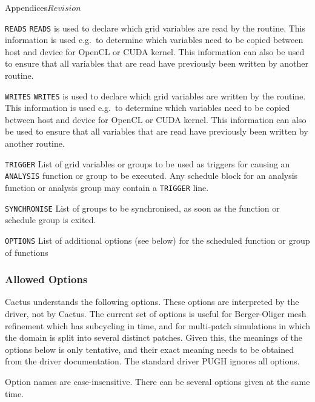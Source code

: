 \begin{cactuspart}{Appendices}{}{$Revision$}
\begin{Lentry}
\item[\texttt{READS}] \texttt{READS} is used to declare which grid
  variables are read by the routine. This information is used e.g.\ to
  determine which variables need to be copied between host and device
  for OpenCL or CUDA kernel. This information can also be used to
  ensure that all variables that are read have previously been written
  by another routine.

\item[\texttt{WRITES}] \texttt{WRITES} is used to declare which grid
  variables are written by the routine. This information is used e.g.\ to
  determine which variables need to be copied between host and device
  for OpenCL or CUDA kernel. This information can also be used to
  ensure that all variables that are read have previously been written
  by another routine.

  \item[{\tt TRIGGER}] List of grid variables or groups to be used as
  triggers for causing an {\tt ANALYSIS} function or group to be
  executed.  Any schedule block for an analysis function or analysis
  group may contain a {\tt TRIGGER} line.

  \item[{\tt SYNCHRONISE}] List of groups to be synchronised, as soon
    as the function or schedule group is exited.

  \item[{\tt OPTIONS}] List of additional options (see below) for the scheduled function or group of functions

\end{Lentry}

\subsubsection{Allowed Options}

\label{app:allopts}

Cactus understands the following options.  These options are
interpreted by the driver, not by Cactus.  The current set of options
is useful for Berger-Oliger mesh refinement which has subcycling in
time, and for multi-patch simulations in which the domain is split
into several distinct patches.  Given this, the meanings of the
options below is only tentative, and their exact meaning needs to be
obtained from the driver documentation.  The standard driver PUGH
ignores all options.

Option names are case-insensitive.  There can be several options given
at the same time.


\end{cactuspart}
